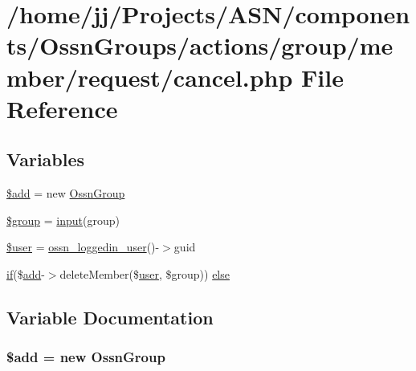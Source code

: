 \hypertarget{cancel_8php}{}\section{/home/jj/\+Projects/\+A\+S\+N/components/\+Ossn\+Groups/actions/group/member/request/cancel.php File Reference}
\label{cancel_8php}
\subsection*{Variables}
\begin{DoxyCompactItemize}
\item 
\hyperlink{cancel_8php_a76aeb354fc71a358526ea9fbd7aae7a4}{\$add} = new \hyperlink{class_ossn_group}{Ossn\+Group}
\item 
\hyperlink{cancel_8php_ad530a85733b0ec1dc321859fd8faa0dc}{\$group} = \hyperlink{ossn_8lib_8input_8php_a64ebee98b041c4f75f71ed3cd73cc8ed}{input}(\textquotesingle{}group\textquotesingle{})
\item 
\hyperlink{cancel_8php_a598ca4e71b15a1313ec95f0df1027ca5}{\$user} = \hyperlink{ossn_8lib_8users_8php_aa3c8068d0e6638b414d6a2f6c62565b8}{ossn\+\_\+loggedin\+\_\+user}()-\/$>$guid
\item 
\hyperlink{jquery_8tokeninput_8js_ad8dd46a3cbc004569e34401e9e71771a}{if}(\$\hyperlink{theme_8min_8js_a79ed6f45c867c160601f70dfa5ec2f95}{add}-\/$>$delete\+Member(\$\hyperlink{ossn_8config_8db_8example_8php_a802544b7ba9f79bbf24ef67773d53bed}{user}, \$group)) \hyperlink{cancel_8php_a30a70331ae01e6479af6dec9eacf61bf}{else}
\end{DoxyCompactItemize}


\subsection{Variable Documentation}
\subsubsection[{\texorpdfstring{\$add}{$add}}]{\setlength{\rightskip}{0pt plus 5cm}\${\bf add} = new {\bf Ossn\+Group}}\hypertarget{cancel_8php_a76aeb354fc71a358526ea9fbd7aae7a4}{}\label{cancel_8php_a76aeb354fc71a358526ea9fbd7aae7a4}


